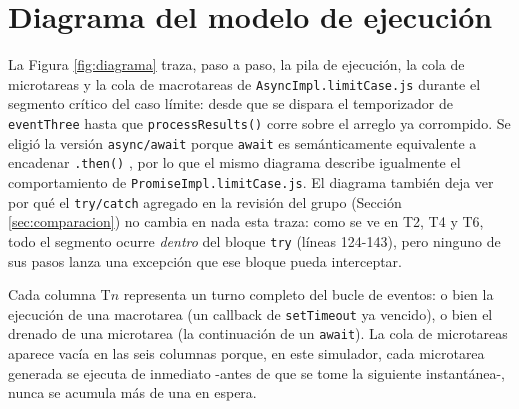 \documentclass[conference,a4paper]{IEEEtran}
\begin{document}
\section{Diagrama del modelo de ejecuci\'on}
\label{sec:diagrama}
La Figura \ref{fig:diagrama} traza, paso a paso, la pila de ejecuci\'on, la cola de microtareas y la cola de macrotareas de \texttt{AsyncImpl.limitCase.js} durante el segmento cr\'itico del caso l\'imite: desde que se dispara el temporizador de \texttt{eventThree} hasta que \texttt{processResults()} corre sobre el arreglo ya corrompido. Se eligi\'o la versi\'on \texttt{async/await} porque \texttt{await} es sem\'anticamente equivalente a encadenar \texttt{.then()} \cite{ecma_async}, por lo que el mismo diagrama describe igualmente el comportamiento de \texttt{PromiseImpl.limitCase.js}. El diagrama tambi\'en deja ver por qu\'e el \texttt{try/catch} agregado en la revisi\'on del grupo (Secci\'on \ref{sec:comparacion}) no cambia en nada esta traza: como se ve en T2, T4 y T6, todo el segmento ocurre \emph{dentro} del bloque \texttt{try} (l\'ineas 124-143), pero ninguno de sus pasos lanza una excepci\'on que ese bloque pueda interceptar.

Cada columna T$n$ representa un turno completo del bucle de eventos: o bien la ejecuci\'on de una macrotarea (un callback de \texttt{setTimeout} ya vencido), o bien el drenado de una microtarea (la continuaci\'on de un \texttt{await}). La cola de microtareas aparece vac\'ia en las seis columnas porque, en este simulador, cada microtarea generada se ejecuta de inmediato -antes de que se tome la siguiente instant\'anea-, nunca se acumula m\'as de una en espera.
\end{document}
